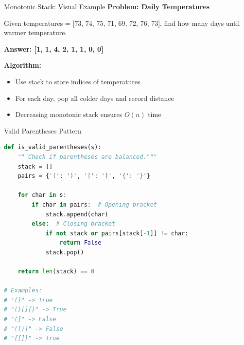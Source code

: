 \documentclass[aspectratio=169,xcolor=dvipsnames]{beamer}
\begin{document}
\begin{frame}{Monotonic Stack: Visual Example}
  \textbf{Problem: Daily Temperatures}

  Given temperatures = [73, 74, 75, 71, 69, 72, 76, 73], find how many days until warmer temperature.

  \vspace{0.3cm}
  \begin{center}
  \end{center}

  \vspace{0.2cm}
  \textbf{Answer: [1, 1, 4, 2, 1, 1, 0, 0]}

  \vspace{0.2cm}
  \textbf{Algorithm:}
  \begin{itemize}
    \item Use stack to store indices of temperatures
    \item For each day, pop all colder days and record distance
    \item Decreasing monotonic stack ensures $O(n)$ time
  \end{itemize}
\end{frame}

\begin{frame}[fragile]{Valid Parentheses Pattern}
\begin{lstlisting}[language=Python, basicstyle=\small\ttfamily]
def is_valid_parentheses(s):
    """Check if parentheses are balanced."""
    stack = []
    pairs = {'(': ')', '[': ']', '{': '}'}

    for char in s:
        if char in pairs:  # Opening bracket
            stack.append(char)
        else:  # Closing bracket
            if not stack or pairs[stack[-1]] != char:
                return False
            stack.pop()

    return len(stack) == 0

# Examples:
# "()" -> True
# "()[]{}" -> True
# "(]" -> False
# "([)]" -> False
# "{[]}" -> True
\end{lstlisting}
\end{frame}
\end{document}
